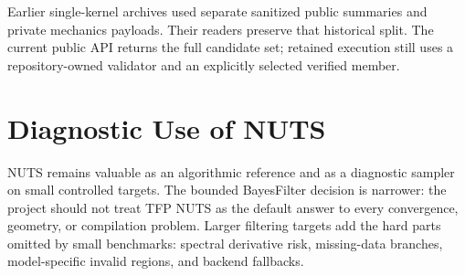 Earlier single-kernel archives used separate sanitized public summaries and
private mechanics payloads. Their readers preserve that historical split.
The current public API returns the full candidate set; retained execution still
uses a repository-owned validator and an explicitly selected verified member.

\section{Diagnostic Use of NUTS}
\label{sec:bf-nuts-diagnostic-use}

NUTS remains valuable as an algorithmic reference and as a diagnostic sampler on
small controlled targets.  The bounded BayesFilter decision is narrower: the
project should not treat TFP NUTS as the default answer to every convergence,
geometry, or compilation problem.  Larger filtering targets add the hard parts
omitted by small benchmarks: spectral derivative risk, missing-data branches,
model-specific invalid regions, and backend fallbacks.
